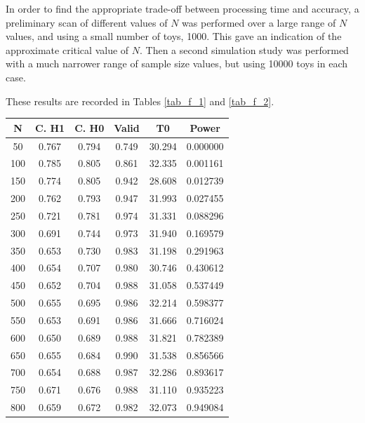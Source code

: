 \documentclass[12pt]{article}
\begin{document}
In order to find the appropriate trade-off between processing time and accuracy, a preliminary scan of different values of $N$ was performed over a large range of $N$ values, and using a small number of toys, 1000.
This gave an indication of the approximate critical value of $N$.
Then a second simulation study was performed with a much narrower range of sample size values, but using 10000 toys in each case.

These results are recorded in Tables \ref{tab_f_1} and \ref{tab_f_2}.

\begin{table}
    \centering
    \begin{tabular}{| c | c | c | c | c | c |}
        \hline
            N & C. H1 & C. H0 & Valid & T0     & Power    \\
        \hline
           50 & 0.767 & 0.794 & 0.749 & 30.294 & 0.000000 \\
        \hline
          100 & 0.785 & 0.805 & 0.861 & 32.335 & 0.001161 \\
        \hline
          150 & 0.774 & 0.805 & 0.942 & 28.608 & 0.012739 \\
        \hline
          200 & 0.762 & 0.793 & 0.947 & 31.993 & 0.027455 \\
        \hline
          250 & 0.721 & 0.781 & 0.974 & 31.331 & 0.088296 \\
        \hline
          300 & 0.691 & 0.744 & 0.973 & 31.940 & 0.169579 \\
        \hline
          350 & 0.653 & 0.730 & 0.983 & 31.198 & 0.291963 \\
        \hline
          400 & 0.654 & 0.707 & 0.980 & 30.746 & 0.430612 \\
        \hline
          450 & 0.652 & 0.704 & 0.988 & 31.058 & 0.537449 \\
        \hline
          500 & 0.655 & 0.695 & 0.986 & 32.214 & 0.598377 \\
        \hline
          550 & 0.653 & 0.691 & 0.986 & 31.666 & 0.716024 \\
        \hline
          600 & 0.650 & 0.689 & 0.988 & 31.821 & 0.782389 \\
        \hline
          650 & 0.655 & 0.684 & 0.990 & 31.538 & 0.856566 \\
        \hline
          700 & 0.654 & 0.688 & 0.987 & 32.286 & 0.893617 \\
        \hline
          750 & 0.671 & 0.676 & 0.988 & 31.110 & 0.935223 \\
        \hline
          800 & 0.659 & 0.672 & 0.982 & 32.073 & 0.949084 \\

\end{tabular}
\end{table}
\end{document}
